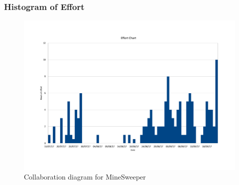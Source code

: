 \documentclass[12pt, a4]{report}
\begin{document}
\subsubsection{Histogram of Effort}
\begin{figure}[!h]
	\centering
	\includegraphics[scale=0.60]{Histogram}
	\caption{Collaboration diagram for MineSweeper}
\end{figure}
	
\end{document}
